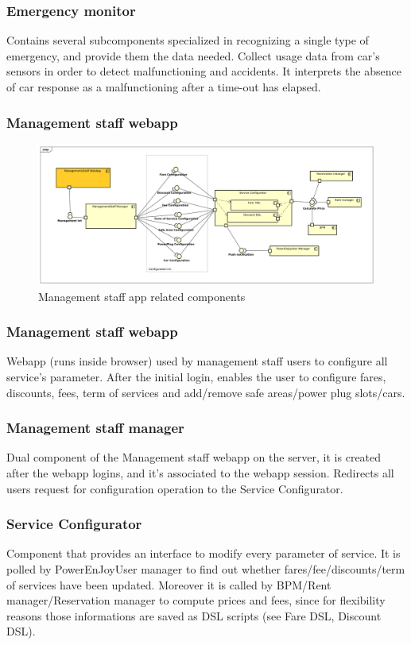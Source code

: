 \documentclass[english]{article}
\begin{document}
		\subsubsection{Emergency monitor}
		Contains several subcomponents specialized in recognizing a single type of emergency, and provide them the data needed. Collect usage data from car's sensors in order to detect malfunctioning and accidents. It interprets the absence of car response as a malfunctioning after a time-out has elapsed.  
	
	
	
\subsubsection*{Management staff webapp}

	\begin{figure}[H]
		\centering
		\includegraphics[scale=0.26]{./ComponentDiagrams/ManagementStaff.pdf}%
		\caption{Management staff app related components}
	\end{figure}

	\subsubsection{Management staff webapp}
	Webapp (runs inside browser) used by management staff users to configure all service's parameter. After the initial login, enables the user to configure fares, discounts, fees, term of services and add/remove safe areas/power plug slots/cars.
	\subsubsection{Management staff manager}
	Dual component of the Management staff webapp on the server, it is created after the webapp logins, and it's associated to the webapp session. Redirects all users request for configuration operation to the Service Configurator.
	\subsubsection{Service Configurator}
	Component that provides an interface to modify every parameter of service. It is polled by PowerEnJoyUser manager to find out whether fares/fee/discounts/term of services have been updated. Moreover it is called by BPM/Rent manager/Reservation manager to compute prices and fees, since for flexibility reasons those informations are saved as DSL scripts (see Fare DSL, Discount DSL).
\end{document}
